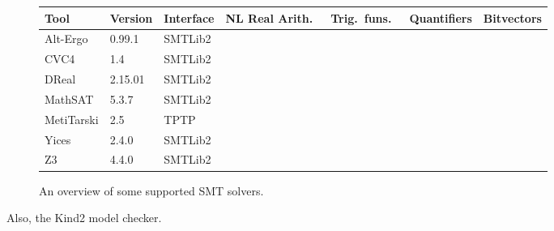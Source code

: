 \begin{figure}
\begin{center}
\begin{tabular}{lllcccc}
Tool       & Version & Interface & NL Real Arith.\ & Trig.\ funs.\ & Quantifiers & Bitvectors \\
\toprule
Alt-Ergo   & 0.99.1  & SMTLib2   & \Yes{}          & \No{}         & \Yes{}      & \No{}      \\
CVC4       & 1.4     & SMTLib2   & \Some{}         & \No{}         & \Yes{}      & \Yes{}     \\
DReal      & 2.15.01 & SMTLib2   & \Yes{}          & \Yes{}        & \No{}       & \No{}      \\
MathSAT    & 5.3.7   & SMTLib2   & \Some{}         & \No{}         & \No{}       & \Yes{}     \\
MetiTarski & 2.5     & TPTP      & \Yes{}          & \Yes{}        & \Yes{}      & \No{}      \\
Yices      & 2.4.0   & SMTLib2   & \Some{}         & \No{}         & \No{}       & \Yes{}     \\
Z3         & 4.4.0   & SMTLib2   & \Yes{}          & \No{}         & \Yes{}      & \Yes{}     \\
\end{tabular}
\end{center}
\caption{An overview of some supported SMT solvers.}
\label{fig:solvers}
\end{figure}

Also, the Kind2 model checker.
